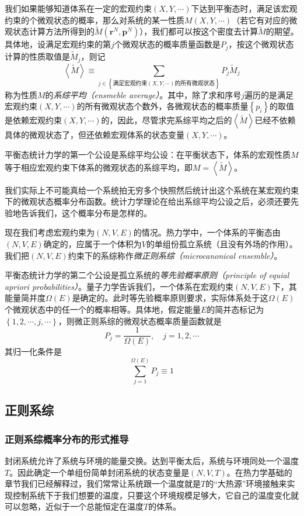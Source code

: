 \documentclass[main.tex]{subfiles}
\begin{document}
我们如果能够知道体系在一定的宏观约束$\left(X,Y,\cdots\right)$下达到平衡态时，满足该宏观约束的个微观状态的概率，那么对系统的某一性质$M\left(X,Y,\cdots\right)$（若它有对应的微观状态计算方法所得到的$\tilde{M}\left(\mathbf{r}^N,\mathbf{p}^N\right)$），我们都可以按这个密度去计算$\tilde{M}$的期望。具体地，设满足宏观约束的第$j$个微观状态的概率质量函数是$P_j$，按这个微观状态计算的性质取值是$\tilde{M}_j$，则记
\[
    \left\langle\tilde{M}\right\rangle\equiv\sum_{j\in\left\{\text{满足宏观约束$\left(X,Y,\cdots\right)$的所有微观状态}\right\}}P_j\tilde{M}_j
\]
称为性质$M$的\emph{系综平均（ensmeble average）}。其中，除了求和序号$j$遍历的是满足宏观约束$\left(X,Y,\cdots\right)$的所有微观状态个数外，各微观状态的概率质量$\left\{p_i\right\}$的取值是依赖宏观约束$\left(X,Y,\cdots\right)$的，因此，尽管求完系综平均之后的$\left\langle\tilde{M}\right\rangle$已经不依赖具体的微观状态了，但还依赖宏观体系的状态变量$\left(X,Y,\cdots\right)$。

平衡态统计力学的第一个公设是系综平均公设：在平衡状态下，体系的宏观性质$M$等于相应宏观约束下体系的微观状态的系综平均，即$M=\left\langle\tilde{M}\right\rangle$。

我们实际上不可能真给一个系统拍无穷多个快照然后统计出这个系统在某宏观约束下的微观状态概率分布函数。统计力学理论在给出系综平均公设之后，必须还要先验地告诉我们，这个概率分布是怎样的。

现在我们考虑宏观约束为$\left(N,V,E\right)$的情况。热力学中，一个体系的平衡态由$\left(N,V,E\right)$确定的，应属于一个体积为$V$的单组份孤立系统（且没有外场的作用）。我们把$\left(N,V,E\right)$约束下的系综称作\emph{微正则系综（microcanonical ensemble）}。

平衡态统计力学的第二个公设是孤立系统的\emph{等先验概率原则（principle of equial apriori probabilities）}。量子力学告诉我们，一个体系在宏观约束$\left(N,V,E\right)$下，其能量简并度$\Omega\left(E\right)$是确定的。此时等先验概率原则要求，实际体系处于这$\Omega\left(E\right)$个微观状态中的任一个的概率相等。具体地，假定能量$E$的简并态标记为$\left\{1,2,\cdots,j,\cdots\right\}$，则微正则系综的微观状态概率质量函数就是
\[P_j=\frac{1}{\Omega\left(E\right)},\quad j=1,2,\cdots\]
其归一化条件是
\[\sum_{j=1}^{\Omega\left(E\right)}P_j\equiv 1\]

\subsection{正则系综}
\subsubsection{正则系综概率分布的形式推导}
封闭系统允许了系统与环境的能量交换。达到平衡太后，系统与环境同处一个温度$T$。因此确定一个单组份简单封闭系统的状态变量是$\left(N,V,T\right)$。在热力学基础的章节我们已经解释过，我们常常让系统跟一个温度就是$T$的“大热源”环境接触来实现控制系统下于我们想要的温度，只要这个环境规模足够大，它自己的温度变化就可以忽略，近似于一个总能恒定在温度$T$的体系。
\end{document}
